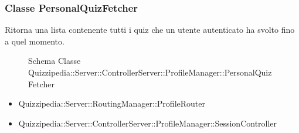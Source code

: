 \subsubsection{Classe PersonalQuizFetcher}
Ritorna una lista contenente tutti i quiz che un utente autenticato ha svolto fino a quel momento.
\begin{figure}[H]
\centering
\noindent{}
\caption[Schema Classe PersonalQuizFetcher]{Schema Classe Quizzipedia::Server::ControllerServer::ProfileManager::PersonalQuizFetcher}
\end{figure}
\begin{itemize}
\item Quizzipedia::Server::RoutingManager::ProfileRouter
\end{itemize}
\begin{itemize}
\item Quizzipedia::Server::ControllerServer::ProfileManager::SessionController
\end{itemize}
